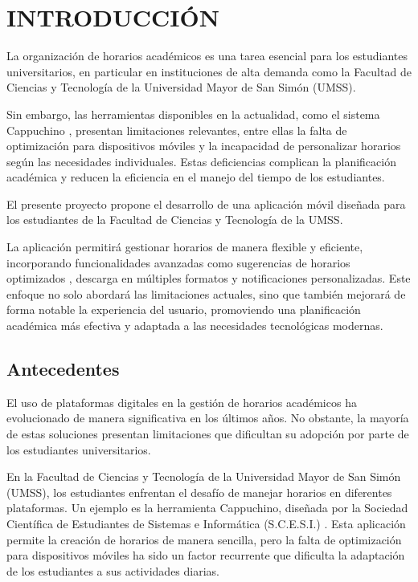 \chapter{INTRODUCCIÓN}
\label{cap:Introducción}

La organización de horarios académicos es una tarea esencial para los estudiantes universitarios, en particular en instituciones de alta demanda como la Facultad de Ciencias y Tecnología de la Universidad Mayor de San Simón (UMSS).

Sin embargo, las herramientas disponibles en la actualidad, como el sistema Cappuchino \cite{cappuccino_umss}, presentan limitaciones relevantes, entre ellas la falta de optimización para dispositivos móviles y la incapacidad de personalizar horarios según las necesidades individuales. Estas deficiencias complican la planificación académica y reducen la eficiencia en el manejo del tiempo de los estudiantes.

El presente proyecto propone el desarrollo de una aplicación móvil diseñada para los estudiantes de la Facultad de Ciencias y Tecnología de la UMSS.

La aplicación permitirá gestionar horarios de manera flexible y eficiente, incorporando funcionalidades avanzadas como sugerencias de horarios optimizados \cite{smart_timetable}, descarga en múltiples formatos y notificaciones personalizadas. Este enfoque no solo abordará las limitaciones actuales, sino que también mejorará de forma notable la experiencia del usuario, promoviendo una planificación académica más efectiva y adaptada a las necesidades tecnológicas modernas.

\section{Antecedentes}
\label{sec:Antecedentes}

El uso de plataformas digitales en la gestión de horarios académicos ha evolucionado de manera significativa en los últimos años. No obstante, la mayoría de estas soluciones presentan limitaciones que dificultan su adopción por parte de los estudiantes universitarios.

En la Facultad de Ciencias y Tecnología de la Universidad Mayor de San Simón (UMSS), los estudiantes enfrentan el desafío de manejar horarios en diferentes plataformas. Un ejemplo es la herramienta Cappuchino, diseñada por la Sociedad Científica de Estudiantes de Sistemas e Informática (S.C.E.S.I.) \cite{cappuccino_umss}. Esta aplicación permite la creación de horarios de manera sencilla, pero la falta de optimización para dispositivos móviles ha sido un factor recurrente que dificulta la adaptación de los estudiantes a sus actividades diarias.

